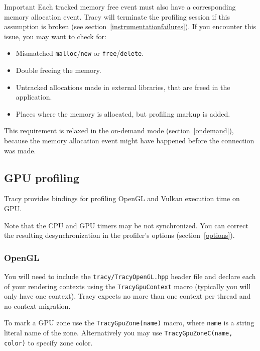 \documentclass[hidelinks,titlepage,a4paper]{article}
\begin{document}
\begin{bclogo}[
noborder=true,
couleur=black!5,
logo=\bcbombe
]{Important}
Each tracked memory free event must also have a corresponding memory allocation event. Tracy will terminate the profiling session if this assumption is broken (see section~\ref{instrumentationfailures}). If you encounter this issue, you may want to check for:

\begin{itemize}
\item Mismatched \texttt{malloc}/\texttt{new} or \texttt{free}/\texttt{delete}.
\item Double freeing the memory.
\item Untracked allocations made in external libraries, that are freed in the application.
\item Places where the memory is allocated, but profiling markup is added.
\end{itemize}

This requirement is relaxed in the on-demand mode (section~\ref{ondemand}), because the memory allocation event might have happened before the connection was made.
\end{bclogo}

\subsection{GPU profiling}
\label{gpuprofiling}

Tracy provides bindings for profiling OpenGL and Vulkan execution time on GPU.

Note that the CPU and GPU timers may be not synchronized. You can correct the resulting desynchronization in the profiler's options (section~\ref{options}).

\subsubsection{OpenGL}

You will need to include the \texttt{tracy/TracyOpenGL.hpp} header file and declare each of your rendering contexts using the \texttt{TracyGpuContext} macro (typically you will only have one context). Tracy expects no more than one context per thread and no context migration.

To mark a GPU zone use the \texttt{TracyGpuZone(name)} macro, where \texttt{name} is a string literal name of the zone. Alternatively you may use \texttt{TracyGpuZoneC(name, color)} to specify zone color.
\end{document}
